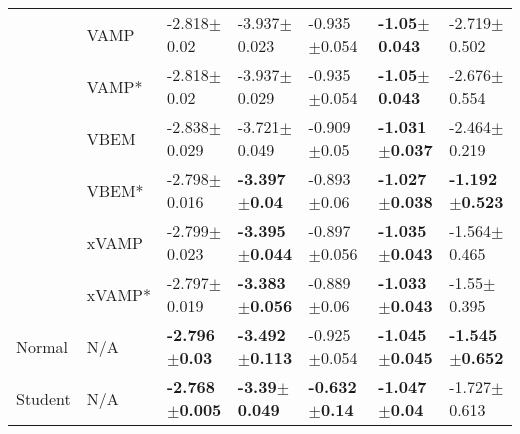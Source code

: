 \begin{tabular}{lllllll}
        & VAMP &            -2.818$\pm$0.02 &           -3.937$\pm$0.023 &          -0.935$\pm$0.054 &   \textbf{-1.05$\pm$0.043} &           -2.719$\pm$0.502 \\
        & VAMP* &            -2.818$\pm$0.02 &           -3.937$\pm$0.029 &          -0.935$\pm$0.054 &   \textbf{-1.05$\pm$0.043} &           -2.676$\pm$0.554 \\
        & VBEM &           -2.838$\pm$0.029 &           -3.721$\pm$0.049 &           -0.909$\pm$0.05 &  \textbf{-1.031$\pm$0.037} &           -2.464$\pm$0.219 \\
        & VBEM* &           -2.798$\pm$0.016 &   \textbf{-3.397$\pm$0.04} &           -0.893$\pm$0.06 &  \textbf{-1.027$\pm$0.038} &  \textbf{-1.192$\pm$0.523} \\
        & xVAMP &           -2.799$\pm$0.023 &  \textbf{-3.395$\pm$0.044} &          -0.897$\pm$0.056 &  \textbf{-1.035$\pm$0.043} &           -1.564$\pm$0.465 \\
        & xVAMP* &           -2.797$\pm$0.019 &  \textbf{-3.383$\pm$0.056} &           -0.889$\pm$0.06 &  \textbf{-1.033$\pm$0.043} &            -1.55$\pm$0.395 \\
Normal & N/A &   \textbf{-2.796$\pm$0.03} &  \textbf{-3.492$\pm$0.113} &          -0.925$\pm$0.054 &  \textbf{-1.045$\pm$0.045} &  \textbf{-1.545$\pm$0.652} \\
Student & N/A &  \textbf{-2.768$\pm$0.005} &   \textbf{-3.39$\pm$0.049} &  \textbf{-0.632$\pm$0.14} &   \textbf{-1.047$\pm$0.04} &           -1.727$\pm$0.613 \\
\bottomrule
\end{tabular}

